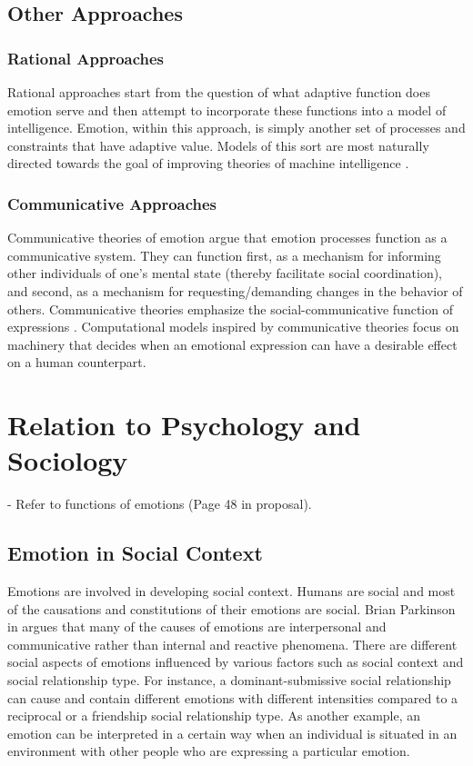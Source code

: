 \documentclass[11pt]{article}
\begin{document}
\subsection{Other Approaches}

\subsubsection{Rational Approaches}

Rational approaches start from the question of what adaptive function does
emotion serve and then attempt to incorporate these functions into a model of
intelligence. Emotion, within this approach, is simply another set of processes
and constraints that have adaptive value. Models of this sort are most naturally
directed towards the goal of improving theories of machine intelligence
\cite{anderson:newell-cognition} \cite{scheutz:affect-agent}
\cite{simon:motivation-emotion-cognition}.

\subsubsection{Communicative Approaches}

Communicative theories of emotion argue that emotion processes function as a
communicative system. They can function first, as a mechanism for informing
other individuals of one’s mental state (thereby facilitate social
coordination), and second, as a mechanism for requesting/demanding changes in
the behavior of others. Communicative theories emphasize the
social-communicative function of expressions \cite{gratch:emotion-intention}.
Computational models inspired by communicative theories focus on machinery that
decides when an emotional expression can have a desirable effect on a human
counterpart.

\section{Relation to Psychology and Sociology}

- Refer to functions of emotions (Page 48 in proposal).

\subsection{Emotion in Social Context}

Emotions are involved in developing social context. Humans are social and most
of the causations and constitutions of their emotions are social. Brian
Parkinson in \cite{parkinson:emotions-social} argues that many of the causes of
emotions are interpersonal and communicative rather than internal and reactive
phenomena. There are different social aspects of emotions influenced by various
factors such as social context and social relationship type. For instance, a
dominant-submissive social relationship can cause and contain different emotions
with different intensities compared to a reciprocal or a friendship social
relationship type. As another example, an emotion can be interpreted in a
certain way when an individual is situated in an environment with other people
who are expressing a particular emotion.
\end{document}
